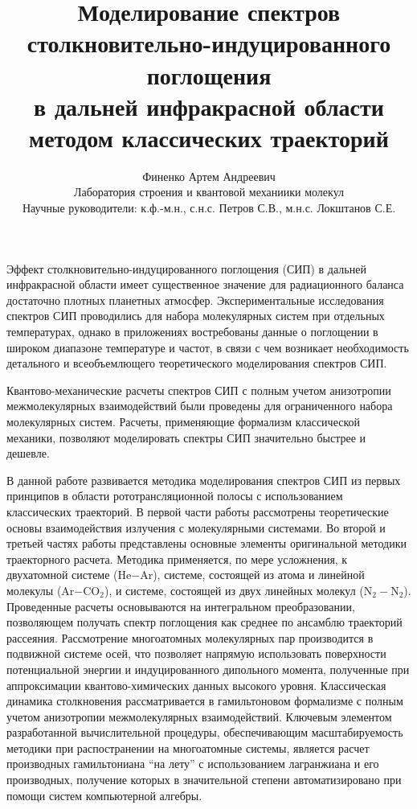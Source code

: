 \documentclass[12pt]{article}
\title{{\LARGE Моделирование спектров столк\-но\-ви\-тель\-но-ин\-ду\-ци\-ро\-ван\-ного поглощения \\в дальней инфракрасной области \\методом классических траекторий}}
\date{}
\author{Финенко Артем Андреевич \\ {\normalsize Лаборатория строения и квантовой механиики молекул} \\ {\normalsize Научные руководители: к.ф.-м.н., с.н.с. Петров С.В., м.н.с. Локштанов С.Е.}}
\begin{document}
\maketitle
\vspace*{-1.0cm}
Эффект столкновительно-индуцированного поглощения (СИП) в дальней инфракрасной области имеет существенное значение для радиационного баланса достаточно плотных планетных атмосфер. Экспериментальные исследования спектров СИП проводились для набора молекулярных систем при отдельных температурах, однако в приложениях востребованы данные о поглощении в широком диапазоне температуре и частот, в связи с чем возникает необходимость детального и всеобъемлющего теоретического моделирования спектров СИП. \par
Квантово-механические расчеты спектров СИП с полным учетом анизотропии межмолекулярных взаимодействий были проведены для ограниченного набора молекулярных систем. Расчеты, применяющие формализм классической механики, позволяют моделировать спектры СИП значительно быстрее и дешевле. \par  
В данной работе развивается методика моделирования спектров СИП из первых принципов в области рототрансляционной полосы с использованием классических траекторий. В первой части работы рассмотрены теоретические основы взаимодействия излучения с молекулярными системами. Во второй и третьей частях работы представлены основные элементы оригинальной методики траекторного расчета. Методика применяется, по мере усложнения, к двухатомной системе (He$-$Ar), системе, состоящей из атома и линейной молекулы (Ar$-$CO$_2$), и системе, состоящей из двух линейных молекул (N$_2-$N$_2$). Проведенные расчеты основываются на интегральном преобразовании, позволяющем получать спектр поглощения как среднее по ансамблю траекторий рассеяния. Рассмотрение многоатомных молекулярных пар производится в подвижной системе осей, что позволяет напрямую использовать поверхности потенциальной энергии и индуцированного дипольного момента, полученные при аппроксимации квантово-химических данных высокого уровня. Классическая динамика столкновения рассматривается в гамильтоновом формализме с полным учетом анизотропии межмолекулярных взаимодействий. Ключевым элементом разработанной вычислительной процедуры, обеспечивающим масштабируемость методики при распостранении на многоатомные системы, является расчет производных гамильтониана \enquote{на лету} с использованием лагранжиана и его производных, получение которых в значительной степени автоматизировано при помощи систем компьютерной алгебры. \par 
\end{document}
